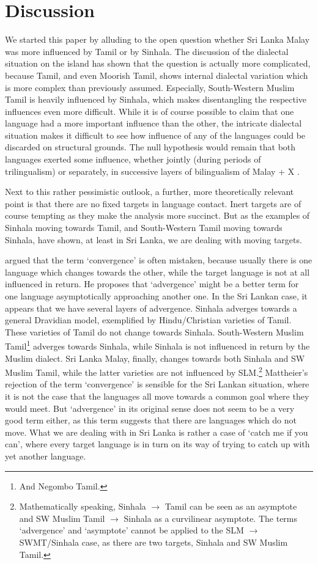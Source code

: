 \documentclass{article}
\begin{document}
\section{Discussion} \label{sec:discussion}
We started this paper by alluding to the open question whether Sri Lanka Malay was more influenced by Tamil or by Sinhala. The discussion of the dialectal situation on the island has shown that the question is actually more complicated, because Tamil, and even Moorish Tamil, shows internal dialectal variation which is more complex than previously assumed. Especially, South-Western Muslim Tamil is heavily influenced by Sinhala, which makes disentangling the respective influences even more difficult. While it is of course possible to claim that one language had a more important influence than the other, the intricate dialectal situation makes it difficult to see how influence of any of the languages could be discarded on structural grounds. 
The null hypothesis would remain that both languages exerted some influence, whether jointly (during periods of trilingualism) or separately, in successive layers of bilingualism of Malay + X \citep[cf.][]{Nordhoff2012xcmultilayer}.

Next to this rather pessimistic outlook, a further, more theoretically relevant point is that there are no fixed targets in language contact. Inert targets are of course tempting as they make the analysis more succinct. But as the examples of Sinhala moving towards Tamil, and South-Western Tamil moving towards Sinhala, have shown, at least in Sri Lanka, we are dealing with moving targets.  

\citet{Mattheier1996} argued that the term `convergence' is often mistaken, because usually there is one language which changes towards the other, while the target language is not at all influenced in return. He proposes that `advergence' might be a better term for one language asymptotically approaching another one. In the Sri Lankan case, it appears that we have several layers of advergence. Sinhala adverges towards a general Dravidian model, exemplified by Hindu/Christian varieties of Tamil. These varieties of Tamil do not change towards Sinhala. South-Western Muslim Tamil\footnote{And
 Negombo Tamil.
} adverges towards Sinhala, while Sinhala is not influenced in return by the Muslim dialect. Sri Lanka Malay, finally, changes towards both Sinhala and SW Muslim Tamil, while the latter varieties are not influenced by SLM.\footnote{Mathematically
 speaking, Sinhala $\to$ Tamil can be seen as an asymptote and SW Muslim Tamil $\to$ Sinhala as a curvilinear asymptote. The terms `advergence' and `asymptote' cannot be applied to the SLM  $\to$ SWMT/Sinhala case, as there are two targets, Sinhala and SW Muslim Tamil.
}
Mattheier's rejection of the term `convergence' is sensible for the Sri Lankan situation, where it is not the case that the languages all move towards a common goal where they would meet. But `advergence' in its original sense does not seem to be a very good term either, as this term suggests that there are languages which do not move. What we are dealing with in Sri Lanka is rather a case of `catch me if you can', where every target language is in turn on its way of trying to catch up with yet another language. 
\end{document}
